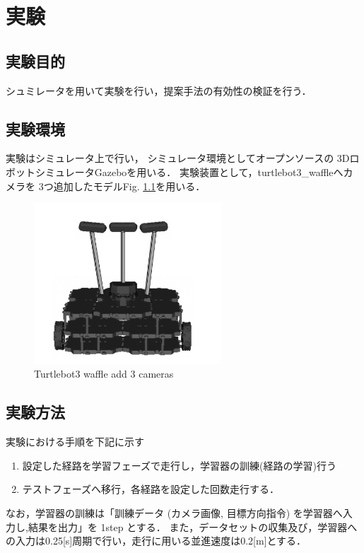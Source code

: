 \chapter{実験}
\section{実験目的}
シュミレータを用いて実験を行い，提案手法の有効性の検証を行う．
\section{実験環境}
実験はシミュレータ上で行い，
シミュレータ環境としてオープンソースの
3DロボットシミュレータGazebo\cite{gazebo:online}を用いる．
実験装置として，turtlebot3\_waffle\cite{turtlebot3:online}へカメラを
3つ追加したモデルFig. \ref{fig::turtlebot3}を用いる．

\begin{figure}[H]
    \centering
    \includegraphics[width = 7cm]{./figs/3_camera.png}
    \caption{Turtlebot3 waffle add 3 cameras}
    \label{fig::turtlebot3}
\end{figure}

\section{実験方法}

実験における手順を下記に示す
\begin{enumerate}
  \item 設定した経路を学習フェーズで走行し，学習器の訓練(経路の学習)行う
  \item テストフェーズへ移行，各経路を設定した回数走行する．
\end{enumerate}
なお，学習器の訓練は「訓練データ (カメラ画像, 目標方向指令) を学習器へ入力し,結果を出力」を 1step とする．
また，データセットの収集及び，学習器への入力は0.25[s]周期で行い，走行に用いる並進速度は0.2[m]とする．


